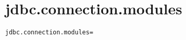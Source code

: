\section{jdbc.connection.modules}
\label{configuration:JdbcConnectionModules}
\AvailableInJavaOnly{\TODO}
\begin{lstlisting}[style=Props,caption={Usage example for \textit{jdbc.connection.modules}}]
jdbc.connection.modules=
\end{lstlisting}